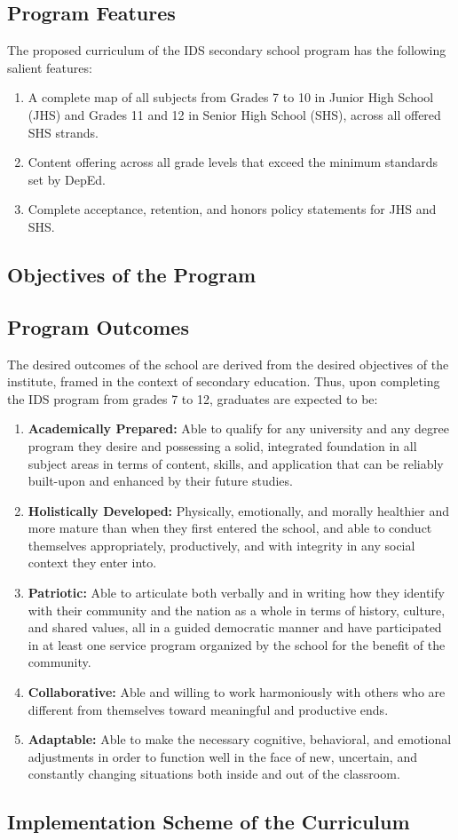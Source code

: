 \subsection{Program Features}
The proposed curriculum of the IDS secondary school program has the following salient features:
\begin{enumerate}[label=(\Alph*)]
	\item{A complete map of all subjects from Grades 7 to 10 in Junior High School (JHS) and Grades 11 and 12 in Senior High School (SHS), across all offered SHS strands.}
	\item{Content offering across all grade levels that exceed the minimum standards set by DepEd.}
	\item{Complete acceptance, retention, and honors policy statements for JHS and SHS.}
\end{enumerate}



\subsection{Objectives of the Program}



\subsection{Program Outcomes}
The desired outcomes of the school are derived from the desired objectives of the institute, framed in the context of secondary education. Thus, upon completing the IDS program from grades 7 to 12, graduates are expected to be:
\begin{enumerate}
	\item{\textbf{Academically Prepared:} Able to qualify for any university and any degree program they desire and
possessing a solid, integrated foundation in all subject areas in terms of content, skills, and application that can be reliably built-upon and enhanced by their future studies.}
	\item{\textbf{Holistically Developed:} Physically, emotionally, and morally healthier and more mature than when they first entered the school, and able to conduct themselves appropriately, productively, and with integrity in any social context they enter into.}
	\item{\textbf{Patriotic:} Able to articulate both verbally and in writing how they identify with their community and the nation as a whole in terms of history, culture, and shared values, all in a guided democratic manner and have participated in at least one service program organized by the school for the benefit of the community.}
	\item{\textbf{Collaborative:} Able and willing to work harmoniously with others who are different from themselves toward meaningful and productive ends.}
	\item{\textbf{Adaptable:} Able to make the necessary cognitive, behavioral, and emotional adjustments in order to function well in the face of new, uncertain, and constantly changing situations both inside and out of the classroom.}
\end{enumerate}


\subsection{Implementation Scheme of the Curriculum}




